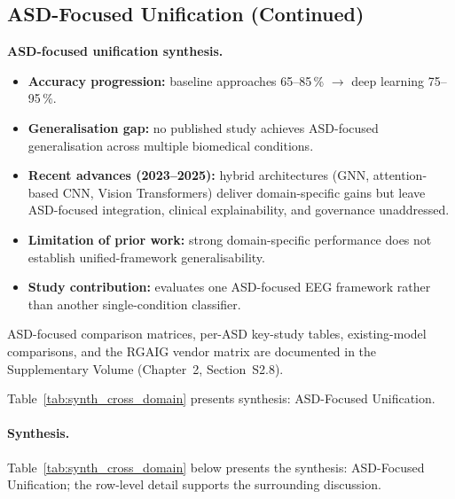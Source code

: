 \subsection{ASD-Focused Unification (Continued)}

\noindent\textbf{ASD-focused unification synthesis.}
\begin{itemize}[leftmargin=*, itemsep=2pt]
    \item \textbf{Accuracy progression:} baseline approaches 65--85\,\% $\to$ deep learning 75--95\,\%.
    \item \textbf{Generalisation gap:} no published study achieves ASD-focused generalisation across multiple biomedical conditions.
    \item \textbf{Recent advances (2023--2025):} hybrid architectures (GNN, attention-based CNN, Vision Transformers) deliver domain-specific gains but leave ASD-focused integration, clinical explainability, and governance unaddressed.
    \item \textbf{Limitation of prior work:} strong domain-specific performance does not establish unified-framework generalisability.
    \item \textbf{Study contribution:} evaluates one ASD-focused EEG framework rather than another single-condition classifier.
\end{itemize}
\noindent ASD-focused comparison matrices, per-ASD key-study tables, existing-model comparisons, and the RGAIG vendor matrix are documented in the Supplementary Volume (Chapter~2, Section~S2.8).



\noindent Table~\ref{tab:synth_cross_domain} presents synthesis: ASD-Focused Unification.

\paragraph{Synthesis.}


\noindent Table~\ref{tab:synth_cross_domain} below presents the synthesis: ASD-Focused Unification; the row-level detail supports the surrounding discussion.


